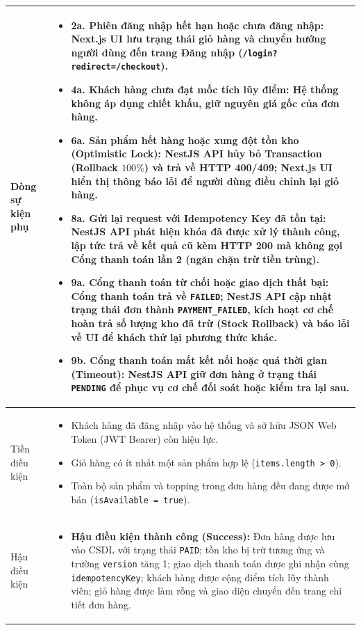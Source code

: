 \documentclass[12pt,a4paper]{article}
\begin{document}
\begin{center}
\begin{xltabular}{\textwidth}{|>{\bfseries\raggedright\arraybackslash}p{3.2cm}|>{\raggedright\arraybackslash}X|}
\hline
Dòng sự kiện phụ & 
\begin{itemize}[leftmargin=*,itemsep=2pt,topsep=2pt,parsep=0pt,partopsep=0pt]
    \item \textbf{2a. Phiên đăng nhập hết hạn hoặc chưa đăng nhập:} Next.js UI lưu trạng thái giỏ hàng và chuyển hướng người dùng đến trang Đăng nhập (\texttt{/login?redirect=/checkout}).
    \item \textbf{4a. Khách hàng chưa đạt mốc tích lũy điểm:} Hệ thống không áp dụng chiết khấu, giữ nguyên giá gốc của đơn hàng.
    \item \textbf{6a. Sản phẩm hết hàng hoặc xung đột tồn kho (Optimistic Lock):} NestJS API hủy bỏ Transaction (Rollback $100\%$) và trả về HTTP 400/409; Next.js UI hiển thị thông báo lỗi để người dùng điều chỉnh lại giỏ hàng.
    \item \textbf{8a. Gửi lại request với Idempotency Key đã tồn tại:} NestJS API phát hiện khóa đã được xử lý thành công, lập tức trả về kết quả cũ kèm HTTP 200 mà không gọi Cổng thanh toán lần 2 (ngăn chặn trừ tiền trùng).
    \item \textbf{9a. Cổng thanh toán từ chối hoặc giao dịch thất bại:} Cổng thanh toán trả về \texttt{FAILED}; NestJS API cập nhật trạng thái đơn thành \texttt{PAYMENT\_FAILED}, kích hoạt cơ chế hoàn trả số lượng kho đã trừ (Stock Rollback) và báo lỗi về UI để khách thử lại phương thức khác.
    \item \textbf{9b. Cổng thanh toán mất kết nối hoặc quá thời gian (Timeout):} NestJS API giữ đơn hàng ở trạng thái \texttt{PENDING} để phục vụ cơ chế đối soát hoặc kiểm tra lại sau.
\end{itemize} \\
\hline
Tiền điều kiện & 
\begin{itemize}[leftmargin=*,itemsep=2pt,topsep=2pt,parsep=0pt,partopsep=0pt]
    \item Khách hàng đã đăng nhập vào hệ thống và sở hữu JSON Web Token (JWT Bearer) còn hiệu lực.
    \item Giỏ hàng có ít nhất một sản phẩm hợp lệ (\texttt{items.length > 0}).
    \item Toàn bộ sản phẩm và topping trong đơn hàng đều đang được mở bán (\texttt{isAvailable = true}).
\end{itemize} \\
\hline
Hậu điều kiện & 
\begin{itemize}[leftmargin=*,itemsep=2pt,topsep=2pt,parsep=0pt,partopsep=0pt]
    \item \textbf{Hậu điều kiện thành công (Success):} Đơn hàng được lưu vào CSDL với trạng thái \texttt{PAID}; tồn kho bị trừ tương ứng và trường \texttt{version} tăng 1; giao dịch thanh toán được ghi nhận cùng \texttt{idempotencyKey}; khách hàng được cộng điểm tích lũy thành viên; giỏ hàng được làm rỗng và giao diện chuyển đến trang chi tiết đơn hàng.

\end{itemize}
\end{xltabular}
\end{center}
\end{document}
